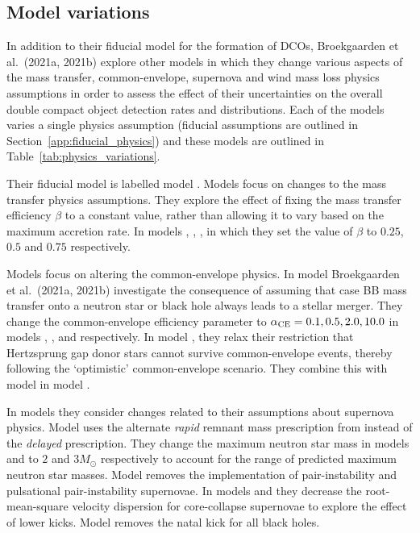 \subsection{Model variations} \label{sec:variation_assumptions}
In addition to their fiducial model for the formation of DCOs, Broekgaarden et al.\ (2021a, 2021b) explore \nMinusOneModels{} other models in which they change various aspects of the mass transfer, common-envelope, supernova and wind mass loss physics assumptions in order to assess the effect of their uncertainties on the overall double compact object detection rates and distributions. Each of the models varies a single physics assumption (fiducial assumptions are outlined in Section~\ref{app:fiducial_physics}) and these models are outlined in Table~\ref{tab:physics_variations}.

Their fiducial model is labelled model \modFid{}. Models \modRangeMT{} focus on changes to the mass transfer physics assumptions. They explore the effect of fixing the mass transfer efficiency $\beta$ to a constant value, rather than allowing it to vary based on the maximum accretion rate. In models \modBetaLow{}, \modBetaMed{}, \modBetaHigh{}, in which they set the value of $\beta$ to $0.25$, $0.5$ and $0.75$ respectively.

Models \modRangeCE{} focus on altering the common-envelope physics.  In model \modCaseBB{} Broekgaarden et al.\ (2021a, 2021b) investigate the consequence of assuming that case BB mass transfer onto a neutron star or black hole always leads to a stellar merger. They change the common-envelope efficiency parameter to $\alpha_{\rm CE} = 0.1, 0.5, 2.0, 10.0$ in models \modAlphaLowest{}, \modAlphaLow{}, \modAlphaHigh{} and \modAlphaHighest{} respectively. In model \modOpt{}, they relax their restriction that Hertzsprung gap donor stars cannot survive common-envelope events, thereby following the `optimistic' common-envelope scenario. They combine this with model \modCaseBB{} in model \modCaseBBOpt{}.

In models \modRangeSN{} they consider changes related to their assumptions about supernova physics. Model \modRapid{} uses the alternate \textit{rapid} remnant mass prescription from \citet{Fryer+2012} instead of the \textit{delayed} prescription. They change the maximum neutron star mass in models \modNSLow{} and \modNSHigh{} to $2$ and $3 \unit{M_{\odot}}$ respectively to account for the range of predicted maximum neutron star masses. Model \modNoPISN{} removes the implementation of pair-instability and pulsational pair-instability supernovae. In models \modSigLow{} and \modSigLower{} they decrease the root-mean-square velocity dispersion for core-collapse supernovae to explore the effect of lower kicks. Model \modNoBH{} removes the natal kick for all black holes.

